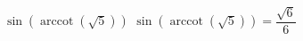  {$\sin\left(\operatorname{arccot}\left(\sqrt{5}\right)\right)$ }
{ $\sin\left(\operatorname{arccot}\left(\sqrt{5}\right)\right) = \dfrac{\sqrt{6}}{6}$}
